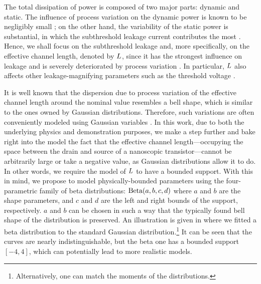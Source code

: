 The total dissipation of power is composed of two major parts: dynamic and static.
The influence of process variation on the dynamic power is known to be negligibly small \cite{srivastava2010}; on the other hand, the variability of the static power is substantial, in which the subthreshold leakage current contributes the most \cite{juan2011, juan2012}.
Hence, we shall focus on the subthreshold leakage and, more specifically, on the effective channel length, denoted by $L$, since it has the strongest influence on leakage and is severely deteriorated by process variation \cite{chandrakasan2001}.
In particular, $L$ also affects other leakage-magnifying parameters such as the threshold voltage \cite{juan2011}.

It is well known that the dispersion due to process variation of the effective channel length around the nominal value resembles a bell shape, which is similar to the ones owned by Gaussian distributions.
Therefore, such variations are often conveniently modeled using Gaussian variables \cite{srivastava2010, juan2011, juan2012, chandra2010, huang2009, lee2013, shen2009, bhardwaj2006, ghanta2006}.
In this work, due to both the underlying physics and demonstration purposes, we make a step further and bake right into the model the fact that the effective channel length---occupying the space between the drain and source of a nanoscopic transistor---cannot be arbitrarily large or take a negative value, as Gaussian distributions allow it to do.
In other words, we require the model of $L$ to have a bounded support.
With this in mind, we propose to model physically-bounded parameters using the four-parametric family of beta distributions: $\text{Beta}(a, b, c, d)$ where $a$ and $b$ are the shape parameters, and $c$ and $d$ are the left and right bounds of the support, respectively.
$a$ and $b$ can be chosen in such a way that the typically found bell shape of the distribution is preserved.
An illustration is given in  where we fitted a beta distribution to the standard Gaussian distribution.\footnote{Alternatively, one can match the moments of the distributions.}
It can be seen that the curves are nearly indistinguishable, but the beta one has a bounded support $[-4, 4]$, which can potentially lead to more realistic models.

